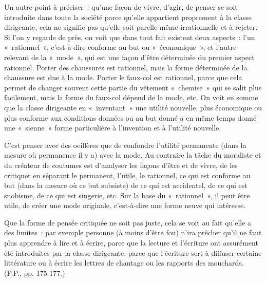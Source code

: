 \documentclass[french,twoside]{book} %
\begin{document}
\noindent Un autre point à préciser : qu’une façon de vivre, d’agir, de penser se soit introduite dans toute la société parce qu’elle appartient proprement à la classe dirigeante, cela ne signifie pas qu’elle soit parelle-même irrationnelle et à rejeter. Si l’on y regarde de près, on voit que dans tout fait existent deux aspects : l’un « rationnel », c’est-à-dire conforme au but ou « économique », et l’autre relevant de la « mode », qui est une façon d’être déterminée du premier aspect rationnel. Porter des chaussures est rationnel, mais la forme déterminée de la chaussure est due à la mode. Porter le faux-col est rationnel, parce que cela permet de changer souvent cette partie du vêtement « chemise » qui se salit plus facilement, mais la forme du faux-col dépend de la mode, etc. On voit en somme que la classe dirigeante en « inventant » une utilité nouvelle, plus économique ou plus conforme aux conditions données ou au but donné a en même temps donné une « sienne » forme particulière à l’invention et à l’utilité nouvelle.\par
C'est penser avec des oeillères que de confondre l’utilité permanente (dans la mesure où permanence il y a) avec la mode. Au contraire la tâche du moraliste et du créateur de coutumes est d’analyser les façons d’être et de vivre, de les critiquer en séparant le permanent, l’utile, le rationnel, ce qui est conforme au but (dans la mesure où ce but subsiste) de ce qui est accidentel, de ce qui est snobisme, de ce qui est singerie, etc. Sur la base du « rationnel », il peut être utile, de créer une mode originale, c’est-à-dire une forme neuve qui intéresse.\par
Que la forme de pensée critiquée ne soit pas juste, cela se voit au fait qu’elle a des limites : par exemple personne (à moins d’être fou) n’ira prêcher qu’il ne faut plus apprendre à lire et à écrire, parce que la lecture et l’écriture ont assurément été introduites par la classe dirigeante, parce que l’écriture sert à diffuser certaine littérature ou à écrire les lettres de chantage ou les rapports des mouchards. (P.P., pp. 175-177.)\par
{\raggedleft \noindent [1932-1933]}
\end{document}
